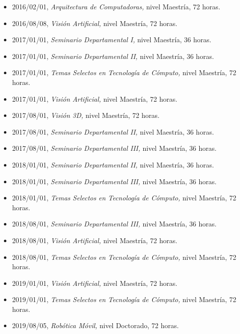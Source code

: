 \begin{itemize} 
\item 2016/02/01, \textit{ Arquitectura de Computadoras,} nivel Maestría, 72 horas. 
\item 2016/08/08, \textit{ Visión Artificial,} nivel Maestría, 72 horas. 
\item 2017/01/01, \textit{ Seminario Departamental I,} nivel Maestría, 36 horas. 
\item 2017/01/01, \textit{ Seminario Departamental II,} nivel Maestría, 36 horas. 
\item 2017/01/01, \textit{ Temas Selectos en Tecnología de Cómputo,} nivel Maestría, 72 horas. 
\item 2017/01/01, \textit{ Visión Artificial,} nivel Maestría, 72 horas. 
\item 2017/08/01, \textit{ Visión 3D,} nivel Maestría, 72 horas. 
\item 2017/08/01, \textit{ Seminario Departamental II,} nivel Maestría, 36 horas. 
\item 2017/08/01, \textit{ Seminario Departamental III,} nivel Maestría, 36 horas. 
\item 2018/01/01, \textit{ Seminario Departamental II,} nivel Maestría, 36 horas. 
\item 2018/01/01, \textit{ Seminario Departamental III,} nivel Maestría, 36 horas. 
\item 2018/01/01, \textit{ Temas Selectos en Tecnología de Cómputo,} nivel Maestría, 72 horas. 
\item 2018/08/01, \textit{ Seminario Departamental III,} nivel Maestría, 36 horas. 
\item 2018/08/01, \textit{ Visión Artificial,} nivel Maestría, 72 horas. 
\item 2018/08/01, \textit{ Temas Selectos en Tecnología de Cómputo,} nivel Maestría, 72 horas. 
\item 2019/01/01, \textit{ Visión Artificial,} nivel Maestría, 72 horas. 
\item 2019/01/01, \textit{ Temas Selectos en Tecnología de Cómputo,} nivel Maestría, 72 horas. 
\item 2019/08/05, \textit{ Robótica Móvil,} nivel Doctorado, 72 horas. 
\end{itemize} 
